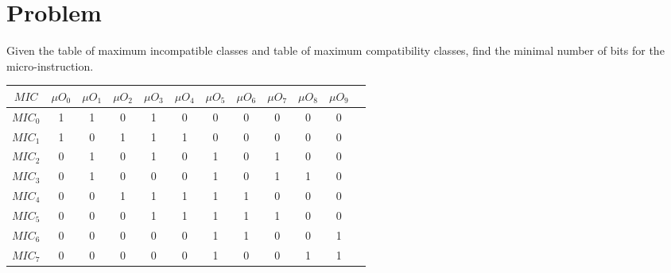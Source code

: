 \section*{Problem}

Given the table of maximum incompatible classes and table of maximum compatibility classes, find the minimal number of bits for the micro-instruction.

\begin{table}[H]
    \centering
        \begin{tabular}{|c|c|c|c|c|c|c|c|c|c|c|c|}
            \hline
            $MIC$ & $\mu O_{0}$ & $\mu O_{1}$ & $\mu O_{2}$ & $\mu O_{3}$ & $\mu O_{4}$ & $\mu O_{5}$ & $\mu O_{6}$ & $\mu O_{7}$ & $\mu O_{8}$ & $\mu O_{9}$ \\ \hline
            $MIC_{0}$ & 1 & 1 & 0 & 1 & 0 & 0 & 0 & 0 & 0 & 0 \\ \hline
            $MIC_{1}$ & 1 & 0 & 1 & 1 & 1 & 0 & 0 & 0 & 0 & 0 \\ \hline
            $MIC_{2}$ & 0 & 1 & 0 & 1 & 0 & 1 & 0 & 1 & 0 & 0 \\ \hline
            $MIC_{3}$ & 0 & 1 & 0 & 0 & 0 & 1 & 0 & 1 & 1 & 0 \\ \hline
            $MIC_{4}$ & 0 & 0 & 1 & 1 & 1 & 1 & 1 & 0 & 0 & 0 \\ \hline
            $MIC_{5}$ & 0 & 0 & 0 & 1 & 1 & 1 & 1 & 1 & 0 & 0 \\ \hline
            $MIC_{6}$ & 0 & 0 & 0 & 0 & 0 & 1 & 1 & 0 & 0 & 1 \\ \hline
            $MIC_{7}$ & 0 & 0 & 0 & 0 & 0 & 1 & 0 & 0 & 1 & 1 \\ \hline
        \end{tabular}
\end{table}

